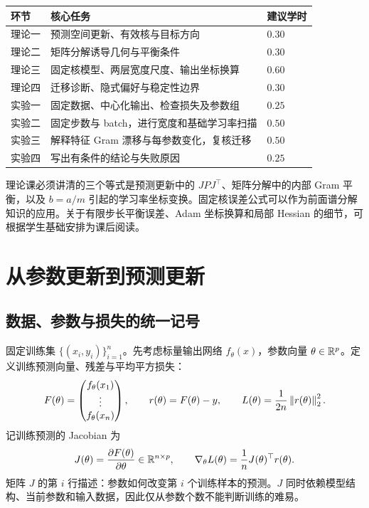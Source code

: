 \begin{center}
\begin{tabularx}{\textwidth}{@{}p{}X p{}@{}}
\toprule
环节 & 核心任务 & 建议学时 \\
\midrule
理论一 & 预测空间更新、有效核与目标方向 & $0.30$ \\
理论二 & 矩阵分解诱导几何与平衡条件 & $0.30$ \\
理论三 & 固定核模型、两层宽度尺度、输出坐标换算 & $0.60$ \\
理论四 & 迁移诊断、隐式偏好与稳定性边界 & $0.30$ \\
\midrule
实验一 & 固定数据、中心化输出、检查损失及参数组 & $0.25$ \\
实验二 & 固定步数与 batch，进行宽度和基础学习率扫描 & $0.50$ \\
实验三 & 解释特征 Gram 漂移与每参数变化，复核迁移 & $0.50$ \\
实验四 & 写出有条件的结论与失败原因 & $0.25$ \\
\bottomrule
\end{tabularx}
\end{center}

理论课必须讲清的三个等式是预测更新中的 $JPJ^\top$、矩阵分解中的内部 Gram 平衡，以及 $b=a/m$ 引起的学习率坐标变换。固定核误差公式可以作为前面谱分解知识的应用。关于有限步长平衡误差、Adam 坐标换算和局部 Hessian 的细节，可根据学生基础安排为课后阅读。

\section{从参数更新到预测更新}
\label{l5:effective-geometry}

\subsection{数据、参数与损失的统一记号}

固定训练集 $\{(x_i,y_i)\}_{i=1}^n$。先考虑标量输出网络 $f_\theta(x)$，参数向量 $\theta\in\mathbb R^p$。定义训练预测向量、残差与平均平方损失：
\begin{equation}
 F(\theta)=\begin{pmatrix}f_\theta(x_1)\\ \vdots\\ f_\theta(x_n)\end{pmatrix},
 \qquad r(\theta)=F(\theta)-y,
 \qquad L(\theta)=\frac{1}{2n}\left\lVert r(\theta)\right\rVert_2^2.
 \label{l5:loss}
\end{equation}
记训练预测的 Jacobian 为
\begin{equation}
 J(\theta)=\frac{\partial F(\theta)}{\partial\theta}
 \in\mathbb R^{n\times p},
 \qquad \nabla_\theta L(\theta)=\frac1nJ(\theta)^\top r(\theta).
 \label{l5:jacobian}
\end{equation}
矩阵 $J$ 的第 $i$ 行描述：参数如何改变第 $i$ 个训练样本的预测。$J$ 同时依赖模型结构、当前参数和输入数据，因此仅从参数个数不能判断训练的难易。

